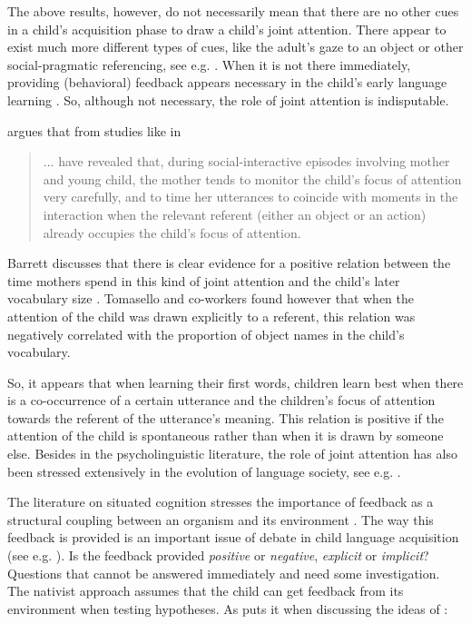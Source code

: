 The above results, however, do not necessarily mean that there are no other cues in a child's acquisition phase to draw a child's joint attention. There appear to exist much more different types of cues, like the adult's gaze to an object or other social-pragmatic referencing, see e.g. \cite{baldwin:1993,tomasello:1992}. When it is not there immediately, providing (behavioral) feedback appears necessary in the child's early language learning \cite{tomasellobarton:1994}. So, although not necessary, the role of joint attention is indisputable. 

 argues that from studies like in \cite{schafferetal:1983,harrisetal:1983,harrisetal:1984}

\begin{quote}
... have revealed that, during social-interactive episodes involving mother and young child, the mother tends to monitor the child's focus of attention very carefully, and to time her utterances to coincide with moments in the interaction when the relevant referent (either an object or an action) already occupies the child's focus of attention. \cite[p. 390]{barrett:1995}
\end{quote}

Barrett discusses that there is clear evidence for a positive relation between the time mothers spend in this kind of joint attention and the child's later vocabulary size \cite{tomasellotodd:1983,tomaselloetal:1986}. Tomasello and co-workers found however that when the attention of the child was drawn explicitly to a referent, this relation was negatively correlated with the proportion of object names in the child's vocabulary.

So, it appears that when learning their first words, children learn best when there is a co-occurrence of a certain utterance and the children's focus of attention towards the referent of the utterance's meaning. This relation  is positive if the attention of the child is spontaneous rather than when it is drawn by someone else. Besides in the psycholinguistic literature, the role of joint attention has also been stressed extensively in the evolution of language society, see e.g. \cite{dessallesghadakpour:2000}.

\p
The literature on situated cognition stresses the importance of feedback as a structural coupling between an organism and its environment \cite{clancey:1997,maturanavarela:1992}. The way this feedback is provided is an important issue of debate in child language acquisition (see e.g. \cite{bowerman:1988}). Is the feedback provided {\em positive} or {\em negative}, {\em explicit} or {\em implicit}? Questions that cannot be answered immediately and need some investigation. The nativist approach assumes that the child can get feedback from its environment when testing hypotheses. As  puts it when discussing the ideas of :

